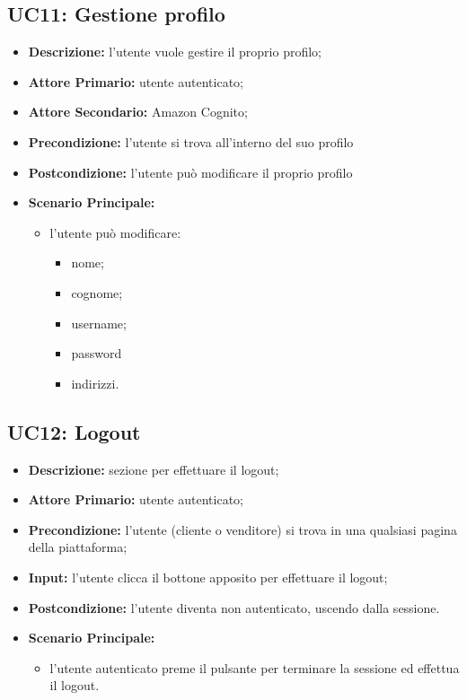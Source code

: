         \subsection{UC11: Gestione profilo}
        \label{sec:UC11}
        \begin{itemize}
            \item \textbf{Descrizione:} l'utente vuole gestire il proprio profilo;
            \item \textbf{Attore Primario:} utente autenticato;
            \item \textbf{Attore Secondario:} Amazon Cognito;
            \item \textbf{Precondizione:} l'utente si trova all'interno del suo profilo
            \item \textbf{Postcondizione:} l'utente può modificare il proprio profilo
            \item \textbf{Scenario Principale:}
            \begin{itemize}
                \item  l'utente può modificare:
                \begin{itemize}
                    \item nome;
                    \item cognome;
                    \item username;
                    \item password
                    \item indirizzi.
                \end{itemize}
            \end{itemize}
        \end{itemize}

        
        \subsection{UC12: Logout}
        \begin{itemize}
            \item \textbf{Descrizione:} sezione per effettuare il logout;
            \item \textbf{Attore Primario:} utente autenticato;
            \item \textbf{Precondizione:} l'utente (cliente o venditore) si trova in una qualsiasi pagina della piattaforma;
            \item \textbf{Input:} l'utente clicca il bottone apposito per effettuare il logout;
            \item \textbf{Postcondizione:} l'utente diventa non autenticato, uscendo dalla sessione.
            \item \textbf{Scenario Principale:}
            \begin{itemize}
                \item l'utente autenticato preme il pulsante per terminare la sessione ed effettua il logout.
            \end{itemize}
        \end{itemize}


